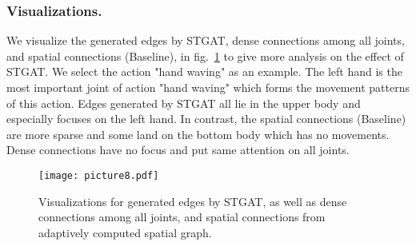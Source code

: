 \documentclass[runningheads]{llncs}
\begin{document}
\subsubsection{Visualizations.} We visualize the generated edges by STGAT, dense connections among all joints, and spatial connections (Baseline), in fig.~\ref{fig8} to give more analysis on the effect of STGAT. We select the action "hand waving" as an example. The left hand is the most important joint of action "hand waving" which forms the movement patterns of this action. Edges generated by STGAT all lie in the upper body and especially focuses on the left hand. In contrast, the spatial connections (Baseline) are more sparse and some land on the bottom body which has no movements. Dense connections have no focus and put same attention on all joints.
  \begin{figure}[t]
    \centering
    \texttt{[image: picture8.pdf]} \caption{Visualizations for generated edges by STGAT, as well as dense connections among all joints, and spatial connections from adaptively computed spatial graph.}
    \label{fig8}
    \end{figure}
\end{document}
